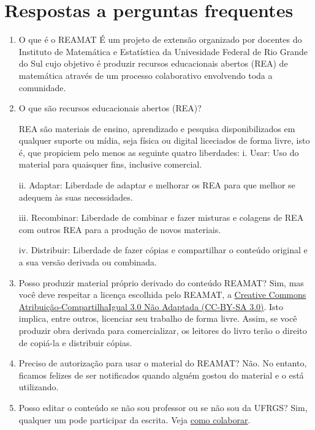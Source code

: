 \documentclass[12pt]{report}
\begin{document}
\chapter*{Respostas a perguntas frequentes}
\begin{enumerate}
\item  O que é o REAMAT 
É um projeto de extensão organizado por docentes do Instituto de Matemática e Estatística da Univesidade Federal de Rio Grande do Sul cujo objetivo é produzir recursos educacionais abertos (REA) de matemática através de um processo colaborativo envolvendo toda a comunidade.  


\item O que são recursos educacionais abertos (REA)? 

REA são materiais de ensino, aprendizado e pesquisa disponibilizados em qualquer suporte ou mídia, seja física ou digital liceciados de forma livre, isto é, que propiciem pelo menos as seguinte quatro liberdades: 
\subitem i. Usar: Uso do material para quaisquer fins, inclusive comercial. 

\subitem ii. Adaptar: Liberdade de adaptar e melhorar os REA para que melhor se adequem às suas necessidades. 

\subitem iii. Recombinar: Liberdade de combinar e fazer misturas e colagens de REA com outros REA para a produção de novos materiais. 

\subitem iv. Distribuir: Liberdade de fazer cópias e compartilhar o conteúdo original e a sua versão derivada ou combinada. 

\item Posso produzir material próprio derivado do conteúdo REAMAT? 
Sim, mas você deve respeitar a licença escolhida pelo REAMAT, a \href{https://creativecommons.org/licenses/by-sa/3.0/}{Creative Commons Atribuição-CompartilhaIgual 3.0 Não Adaptada (CC-BY-SA 3.0)}. Isto implica, entre outros, licenciar seu trabalho de forma livre. Assim, se você produzir obra derivada para comercializar, os leitores do livro terão o direito de copiá-la e distribuir cópias. 

\item Preciso de autorização para usar o material do REAMAT? 
Não. No entanto, ficamos felizes de ser notificados quando alguém gostou do material e o está utilizando. 

\item Posso editar o conteúdo se não sou professor ou se não sou da UFRGS? 
Sim, qualquer um pode participar da escrita. Veja \href{https://www.ufrgs.br/reamat/participe.html}{como colaborar}. 


\end{enumerate}
\end{document}
